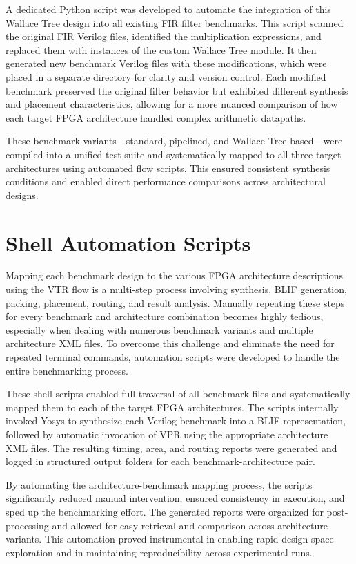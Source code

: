 A dedicated Python script was developed to automate the integration of this Wallace Tree design into all existing FIR filter benchmarks. This script scanned the original FIR Verilog files, identified the multiplication expressions, and replaced them with instances of the custom Wallace Tree module. It then generated new benchmark Verilog files with these modifications, which were placed in a separate directory for clarity and version control. Each modified benchmark preserved the original filter behavior but exhibited different synthesis and placement characteristics, allowing for a more nuanced comparison of how each target FPGA architecture handled complex arithmetic datapaths.

These benchmark variants—standard, pipelined, and Wallace Tree-based—were compiled into a unified test suite and systematically mapped to all three target architectures using automated flow scripts. This ensured consistent synthesis conditions and enabled direct performance comparisons across architectural designs.

\section{Shell Automation Scripts}
Mapping each benchmark design to the various FPGA architecture descriptions using the VTR flow is a multi-step process involving synthesis, BLIF generation, packing, placement, routing, and result analysis. Manually repeating these steps for every benchmark and architecture combination becomes highly tedious, especially when dealing with numerous benchmark variants and multiple architecture XML files. To overcome this challenge and eliminate the need for repeated terminal commands, automation scripts were developed to handle the entire benchmarking process.

These shell scripts enabled full traversal of all benchmark files and systematically mapped them to each of the target FPGA architectures. The scripts internally invoked Yosys to synthesize each Verilog benchmark into a BLIF representation, followed by automatic invocation of VPR using the appropriate architecture XML files. The resulting timing, area, and routing reports were generated and logged in structured output folders for each benchmark-architecture pair.

By automating the architecture-benchmark mapping process, the scripts significantly reduced manual intervention, ensured consistency in execution, and sped up the benchmarking effort. The generated reports were organized for post-processing and allowed for easy retrieval and comparison across architecture variants. This automation proved instrumental in enabling rapid design space exploration and in maintaining reproducibility across experimental runs.

